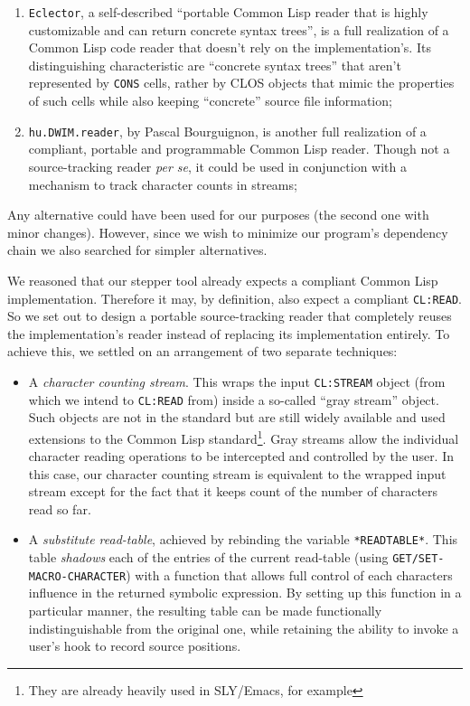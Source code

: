 \documentclass[sigconf]{acmart}
\begin{document}
\begin{enumerate}
\item \texttt{Eclector}\cite{eclector}, a self-described ``portable
  Common Lisp reader that is highly customizable and can return
  concrete syntax trees'', is a full realization of a Common Lisp code
  reader that doesn't rely on the implementation's.  Its
  distinguishing characteristic are ``concrete syntax trees'' that
  aren't represented by \texttt{CONS} cells, rather by CLOS objects
  that mimic the properties of such cells while also keeping
  ``concrete'' source file information;

\item \texttt{hu.DWIM.reader}\cite{bourguignon-reader}, by Pascal
  Bourguignon, is another full realization of a compliant, portable
  and programmable Common Lisp reader.  Though not a source-tracking
  reader \emph{per se}, it could be used in conjunction with a
  mechanism to track character counts in streams;
\end{enumerate}

Any alternative could have been used for our purposes (the second one
with minor changes).  However, since we wish to minimize our program's
dependency chain we also searched for simpler alternatives.

We reasoned that our stepper tool already expects a compliant Common
Lisp implementation.  Therefore it may, by definition, also expect a
compliant \texttt{CL:READ}.  So we set out to design a portable
source-tracking reader that completely reuses the implementation's
reader instead of replacing its implementation entirely.  To achieve
this, we settled on an arrangement of two separate techniques:

\begin{itemize}
\item A \emph{character counting stream}.  This wraps the input
  \texttt{CL:STREAM} object (from which we intend to \texttt{CL:READ}
  from) inside a so-called ``gray stream'' object.  Such objects are
  not in the standard but are still widely available and used
  extensions to the Common Lisp standard\footnote{They are already
    heavily used in SLY/Emacs, for example}.  Gray streams allow the
  individual character reading operations to be intercepted and
  controlled by the user.  In this case, our character counting stream
  is equivalent to the wrapped input stream except for the fact that
  it keeps count of the number of characters read so far.
  
\item A \emph{substitute read-table}, achieved by rebinding the
  variable \texttt{*READTABLE*}.  This table \emph{shadows} each of
  the entries of the current read-table (using
  \texttt{GET/SET-MACRO-CHARACTER}) with a function that allows full
  control of each characters influence in the returned symbolic
  expression.  By setting up this function in a particular manner, the
  resulting table can be made functionally indistinguishable from the
  original one, while retaining the ability to invoke a user's hook to
  record source positions.
\end{itemize}
\end{document}

